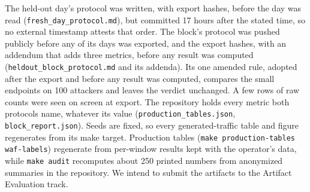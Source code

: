 \documentclass[conference,letterpaper,10pt]{IEEEtran}
\newcommand\1{\textit{(i)}}
\newcommand\2{\textit{(ii)}}
\newcommand\3{\textit{(iii)}}
\newcommand\4{\textit{(iv)}}
\newcommand\5{\textit{(v)}}
\newcommand\6{\textit{(vi)}}
\newcommand\7{\textit{(vii)}}
\newcommand\8{\textit{(viii)}}
\newcommand\9{\textit{(ix)}}
\begin{document}
The held-out day's protocol was written, with export hashes, before the day was read (\texttt{fresh\_day\_protocol.md}), but committed 17 hours after the stated time, so no external timestamp attests that order. The block's protocol was pushed publicly before any of its days was exported, and the export hashes, with an addendum that adds three metrics, before any result was computed (\texttt{heldout\_block\_protocol.md} and its addenda). Its one amended rule, adopted after the export and before any result was computed, compares the small endpoints on 100 attackers and leaves the verdict unchanged. A few rows of raw counts were seen on screen at export. The repository holds every metric both protocols name, whatever its value (\texttt{production\_tables.json}, \texttt{block\_report.json}). Seeds are fixed, so every generated-traffic table and figure regenerates from its make target. Production tables (\texttt{make production-tables waf-labels}) regenerate from per-window results kept with the operator's data, while \texttt{make audit} recomputes about 250 printed numbers from anonymized summaries in the repository. We intend to submit the artifacts to the Artifact Evaluation track.
\end{document}
